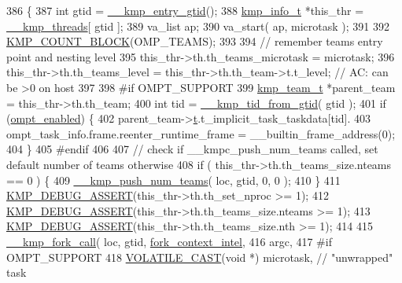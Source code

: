 \begin{DoxyCode}
386 \{
387     \textcolor{keywordtype}{int}         gtid = \hyperlink{kmp_8h_a5d1e6d7c35de87705193f11d65457229}{\_\_kmp\_entry\_gtid}();
388     \hyperlink{kmp_8h_a194859801fe16b326efe34501a37c30a}{kmp\_info\_t} *this\_thr = \hyperlink{kmp_8h_a8ba907eb5a2568ff55a49a1504cd3624}{\_\_kmp\_threads}[ gtid ];
389     va\_list     ap;
390     va\_start(   ap, microtask );
391 
392     \hyperlink{group__STATS__GATHERING_ga7fa64ec62947bf0b97f3f4778dd22196}{KMP\_COUNT\_BLOCK}(OMP\_TEAMS);
393 
394     \textcolor{comment}{// remember teams entry point and nesting level}
395     this\_thr->th.th\_teams\_microtask = microtask;
396     this\_thr->th.th\_teams\_level = this\_thr->th.th\_team->t.t\_level; \textcolor{comment}{// AC: can be >0 on host}
397 
398 \textcolor{preprocessor}{#if OMPT\_SUPPORT}
399 \textcolor{preprocessor}{}    \hyperlink{unionkmp__team}{kmp\_team\_t} *parent\_team = this\_thr->th.th\_team;
400     \textcolor{keywordtype}{int} tid = \hyperlink{kmp_8h_afb8f84fff9682417eb1c484ffbfdc6ee}{\_\_kmp\_tid\_from\_gtid}( gtid );
401     \textcolor{keywordflow}{if} (\hyperlink{ompt-general_8c_a966b31b6d05f79f5495f8d8e71732f68}{ompt\_enabled}) \{
402         parent\_team->\hyperlink{unionkmp__team_a87cf4571108a61b446e809094f8c0362}{t}.t\_implicit\_task\_taskdata[tid].
403            ompt\_task\_info.frame.reenter\_runtime\_frame = \_\_builtin\_frame\_address(0);
404     \}
405 \textcolor{preprocessor}{#endif}
406 \textcolor{preprocessor}{}
407     \textcolor{comment}{// check if \_\_kmpc\_push\_num\_teams called, set default number of teams otherwise}
408     \textcolor{keywordflow}{if} ( this\_thr->th.th\_teams\_size.nteams == 0 ) \{
409         \hyperlink{kmp_8h_aab10ed0eb17c15a67f56bff0d7ef1268}{\_\_kmp\_push\_num\_teams}( loc, gtid, 0, 0 );
410     \}
411     \hyperlink{kmp__debug_8h_ad766efc30e33e28634691088e80cdf08}{KMP\_DEBUG\_ASSERT}(this\_thr->th.th\_set\_nproc >= 1);
412     \hyperlink{kmp__debug_8h_ad766efc30e33e28634691088e80cdf08}{KMP\_DEBUG\_ASSERT}(this\_thr->th.th\_teams\_size.nteams >= 1);
413     \hyperlink{kmp__debug_8h_ad766efc30e33e28634691088e80cdf08}{KMP\_DEBUG\_ASSERT}(this\_thr->th.th\_teams\_size.nth >= 1);
414 
415     \hyperlink{kmp_8h_afa300d153a7fea1038d2cdc72db06498}{\_\_kmp\_fork\_call}( loc, gtid, \hyperlink{kmp_8h_a49ed6f7454c18058b488af399cadd8e0aae2ae74f371252ae8c8bb7ec81d6a38a}{fork\_context\_intel},
416             argc,
417 #\textcolor{keywordflow}{if} OMPT\_SUPPORT
418             \hyperlink{kmp__os_8h_aaa9e2fb88f003bd3a22795aadf723e53}{VOLATILE\_CAST}(\textcolor{keywordtype}{void} *) microtask,               \textcolor{comment}{// "unwrapped" task}

\end{DoxyCode}
